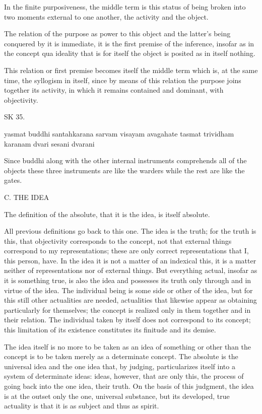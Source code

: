 In the finite purposiveness, the middle term is this status of
being broken into two moments external to one another,
the activity and the object.

The relation of the purpose as power to this object and
the latter's being conquered by it is immediate,
it is the first premise of the inference,
insofar as in the concept qua ideality that is for itself
the object is posited as in itself nothing.

This relation or first premise becomes itself the middle term
which is, at the same time, the syllogism in itself,
since by means of this relation the purpose joins together its activity,
in which it remains contained and dominant, with objectivity.

SK 35.

yasmat buddhi santahkarana sarvam visayam avagahate
tasmat trividham karanam dvari sesani dvarani

Since buddhi along with the other internal instruments
comprehends all of the objects these three instruments are
like the warders while the rest are like the gates.

C. THE IDEA

The definition of the absolute, that it is the idea, is itself absolute.

All previous definitions go back to this one.
The idea is the truth; for the truth is this,
that objectivity corresponds to the concept,
not that external things correspond to my representations;
these are only correct representations that I, this person, have.
In the idea it is not a matter of an indexical this,
it is a matter neither of representations nor of external things.
But everything actual, insofar as it is something true, is also the idea
and possesses its truth only through and in virtue of the idea.
The individual being is some side or other of the idea,
but for this still other actualities are needed,
actualities that likewise appear as obtaining particularly for themselves;
the concept is realized only in them together and in their relation.
The individual taken by itself does not correspond to its concept;
this limitation of its existence constitutes its finitude and its demise.

The idea itself is no more to be taken as an idea of something or other
than the concept is to be taken merely as a determinate concept.
The absolute is the universal idea and the one idea that, by judging,
particularizes itself into a system of determinate ideas:
ideas, however, that are only this,
the process of going back into the one idea, their truth.
On the basis of this judgment, the idea is at the outset only
the one, universal substance, but its developed, true actuality is
that it is as subject and thus as spirit.

